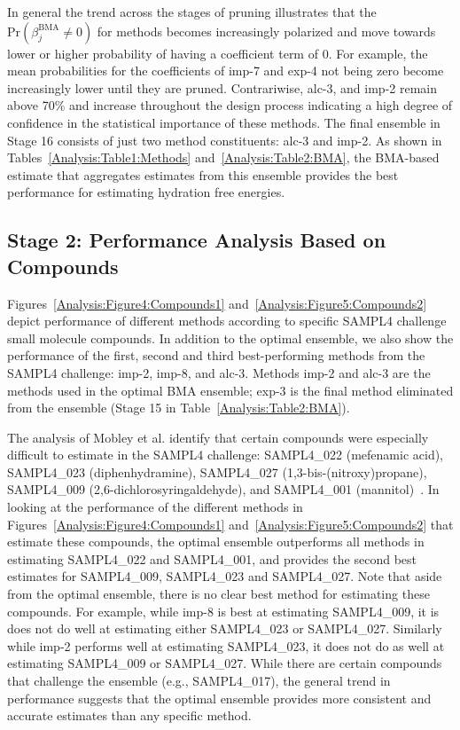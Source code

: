 \documentclass[12pt]{article}
\newcommand{\+}[1]{\ensuremath{\mathbf{#1}}}
\begin{document}
In general the trend across the stages of pruning illustrates that the $\mathrm{Pr}(\beta_j^{\text{BMA}}\neq 0)$ for methods becomes increasingly polarized and move towards lower or higher probability of having a coefficient term of 0.  For example, the mean probabilities for the coefficients of imp-7 and exp-4 not being zero become increasingly lower until they are pruned. Contrariwise, alc-3, and imp-2 remain above 70\% and increase throughout the design process indicating a high degree of confidence in the statistical importance of these methods. The final ensemble in Stage 16 consists of just two method constituents: alc-3 and imp-2. As shown in Tables~\ref{Analysis:Table1:Methods} and~\ref{Analysis:Table2:BMA}, the BMA-based estimate that aggregates estimates from this ensemble provides the best performance for estimating hydration free energies.

\subsection{Stage 2: Performance Analysis Based on Compounds}
\label{Results:BMA_Molecules}
Figures~\ref{Analysis:Figure4:Compounds1} and~\ref{Analysis:Figure5:Compounds2} depict performance of different methods according to specific SAMPL4 challenge small molecule compounds.  In addition to the optimal ensemble, we also show the performance of the first, second and third best-performing methods from the SAMPL4 challenge: imp-2, imp-8, and alc-3.  Methods imp-2 and alc-3 are the methods used in the optimal BMA ensemble;  exp-3 is the final method eliminated from the ensemble (Stage 15 in Table~\ref{Analysis:Table2:BMA}). 

The analysis of Mobley et al. identify that certain compounds were especially difficult to estimate in the SAMPL4 challenge: SAMPL4\_022 (mefenamic acid), SAMPL4\_023 (diphenhydramine), SAMPL4\_027 (1,3-bis-(nitroxy)propane), SAMPL4\_009 (2,6-dichlorosyringaldehyde), and SAMPL4\_001 (mannitol)~\cite{Mobley:2014}. In looking at the performance of the different methods in Figures~\ref{Analysis:Figure4:Compounds1} and~\ref{Analysis:Figure5:Compounds2} that estimate these compounds, the optimal ensemble outperforms all methods in estimating SAMPL4\_022 and SAMPL4\_001, and provides the second best estimates for SAMPL4\_009, SAMPL4\_023 and SAMPL4\_027.  Note that aside from the optimal ensemble, there is no clear best method for estimating these compounds.   For example, while imp-8 is best at estimating SAMPL4\_009, it is does not do well at estimating either SAMPL4\_023 or SAMPL4\_027. Similarly while imp-2 performs well at estimating SAMPL4\_023, it does not do as well at estimating SAMPL4\_009 or SAMPL4\_027.  While there are certain compounds that challenge the ensemble (e.g., SAMPL4\_017), the general trend in performance suggests that the optimal ensemble provides more consistent and accurate estimates than any specific method. 
\end{document}
